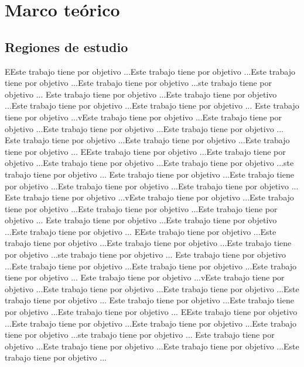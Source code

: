\chapter{Marco teórico}
\section{Regiones de estudio} 
EEste trabajo tiene por objetivo ...Este trabajo tiene por objetivo ...Este trabajo tiene por objetivo ...Este trabajo tiene por objetivo ...ste trabajo tiene por objetivo ...
Este trabajo tiene por objetivo ...Este trabajo tiene por objetivo ...Este trabajo tiene por objetivo ...Este trabajo tiene por objetivo ...
Este trabajo tiene por objetivo ...vEste trabajo tiene por objetivo ...Este trabajo tiene por objetivo ...Este trabajo tiene por objetivo ...Este trabajo tiene por objetivo ...
Este trabajo tiene por objetivo ...Este trabajo tiene por objetivo ...Este trabajo tiene por objetivo ...
EEste trabajo tiene por objetivo ...Este trabajo tiene por objetivo ...Este trabajo tiene por objetivo ...Este trabajo tiene por objetivo ...ste trabajo tiene por objetivo ...
Este trabajo tiene por objetivo ...Este trabajo tiene por objetivo ...Este trabajo tiene por objetivo ...Este trabajo tiene por objetivo ...
Este trabajo tiene por objetivo ...vEste trabajo tiene por objetivo ...Este trabajo tiene por objetivo ...Este trabajo tiene por objetivo ...Este trabajo tiene por objetivo ...
Este trabajo tiene por objetivo ...Este trabajo tiene por objetivo ...Este trabajo tiene por objetivo ...
EEste trabajo tiene por objetivo ...Este trabajo tiene por objetivo ...Este trabajo tiene por objetivo ...Este trabajo tiene por objetivo ...ste trabajo tiene por objetivo ...
Este trabajo tiene por objetivo ...Este trabajo tiene por objetivo ...Este trabajo tiene por objetivo ...Este trabajo tiene por objetivo ...
Este trabajo tiene por objetivo ...vEste trabajo tiene por objetivo ...Este trabajo tiene por objetivo ...Este trabajo tiene por objetivo ...Este trabajo tiene por objetivo ...
Este trabajo tiene por objetivo ...Este trabajo tiene por objetivo ...Este trabajo tiene por objetivo ...
EEste trabajo tiene por objetivo ...Este trabajo tiene por objetivo ...Este trabajo tiene por objetivo ...Este trabajo tiene por objetivo ...ste trabajo tiene por objetivo ...
Este trabajo tiene por objetivo ...Este trabajo tiene por objetivo ...Este trabajo tiene por objetivo ...Este trabajo tiene por objetivo ...
